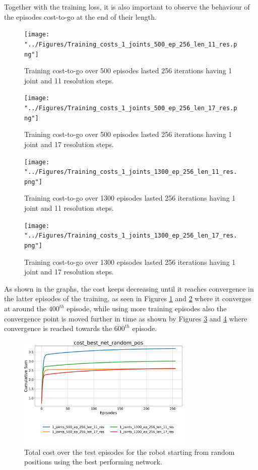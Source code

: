 \documentclass[twocolumn, a4paper]{article}
\begin{document}
Together with the training loss, it is also important to observe the behaviour
of the episodes cost-to-go at the end of their length.

\begin{figure}[H]
	\centering
	\texttt{[image: "../Figures/Training\_costs\_1\_joints\_500\_ep\_256\_len\_11\_res.png"]}
	\caption{Training cost-to-go over 500 episodes lasted 256 iterations having 1
			 joint and 11 resolution steps.}
	\label{fig:Train_cost_to_go_1_500_11}
\end{figure}

\begin{figure}[H]
	\texttt{[image: "../Figures/Training\_costs\_1\_joints\_500\_ep\_256\_len\_17\_res.png"]}
	\caption{Training cost-to-go over 500 episodes lasted 256 iterations having 1
			 joint and 17 resolution steps.}
	\label{fig:Train_cost_to_go_1_500_17}
\end{figure}

\begin{figure}[H]
	\texttt{[image: "../Figures/Training\_costs\_1\_joints\_1300\_ep\_256\_len\_11\_res.png"]}
	\caption{Training cost-to-go over 1300 episodes lasted 256 iterations having 1
			 joint and 11 resolution steps.}
	\label{fig:Train_cost_to_go_1_1300_11}
\end{figure}
\begin{figure}[H]
	\texttt{[image: "../Figures/Training\_costs\_1\_joints\_1300\_ep\_256\_len\_17\_res.png"]}
	\caption{Training cost-to-go over 1300 episodes lasted 256 iterations having 1
			 joint and 17 resolution steps.}
	\label{fig:Train_cost_to_go_1_1300_17}
\end{figure}

As shown in the graphs, the cost keeps decreasing until it reaches convergence
in the latter episodes of the training, as seen in Figures
\ref{fig:Train_cost_to_go_1_500_11} and \ref{fig:Train_cost_to_go_1_500_17}
where it converges at around the $400^{th}$ episode, while using more
training episodes also the convergence point is moved further in time as shown
by Figures \ref{fig:Train_cost_to_go_1_1300_11} and
\ref{fig:Train_cost_to_go_1_1300_17}
where convergence is reached towards the $600^{th}$ episode.

\begin{figure}[H]
	\centering
	\includegraphics[width=8.5cm]{"../Figures/Summary_cost_best_net_random_pos_1J.png"}
	\caption{Total cost over the test episodes for the robot starting from
			 random positions using the best performing network.}
	\label{fig:Test_1_best_net_random_pos}
\end{figure}
\end{document}
